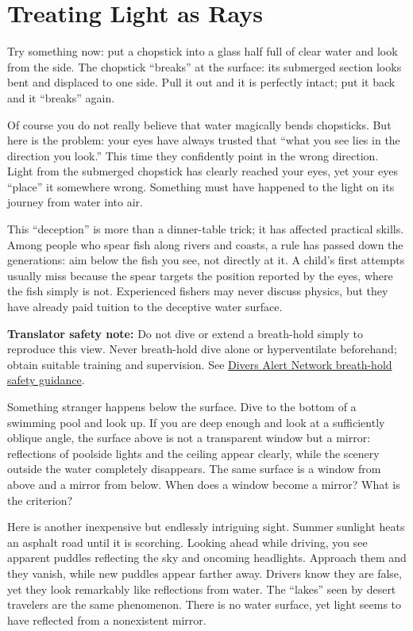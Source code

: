 \chapter{Treating Light as Rays}


Try something now: put a chopstick into a glass half full of clear water and look from the side. The chopstick ``breaks'' at the surface: its submerged section looks bent and displaced to one side. Pull it out and it is perfectly intact; put it back and it ``breaks'' again.

Of course you do not really believe that water magically bends chopsticks. But here is the problem: your eyes have always trusted that ``what you see lies in the direction you look.'' This time they confidently point in the wrong direction. Light from the submerged chopstick has clearly reached your eyes, yet your eyes ``place'' it somewhere wrong. Something must have happened to the light on its journey from water into air.

This ``deception'' is more than a dinner-table trick; it has affected practical skills. Among people who spear fish along rivers and coasts, a rule has passed down the generations: aim below the fish you see, not directly at it. A child's first attempts usually miss because the spear targets the position reported by the eyes, where the fish simply is not. Experienced fishers may never discuss physics, but they have already paid tuition to the deceptive water surface.

\textbf{Translator safety note:} Do not dive or extend a breath-hold simply to reproduce this view. Never breath-hold dive alone or hyperventilate beforehand; obtain suitable training and supervision. See \href{https://world.dan.org/alert-diver/article/freediving-safety-awareness/}{Divers Alert Network breath-hold safety guidance}.

Something stranger happens below the surface. Dive to the bottom of a swimming pool and look up. If you are deep enough and look at a sufficiently oblique angle, the surface above is not a transparent window but a mirror: reflections of poolside lights and the ceiling appear clearly, while the scenery outside the water completely disappears. The same surface is a window from above and a mirror from below. When does a window become a mirror? What is the criterion?

Here is another inexpensive but endlessly intriguing sight. Summer sunlight heats an asphalt road until it is scorching. Looking ahead while driving, you see apparent puddles reflecting the sky and oncoming headlights. Approach them and they vanish, while new puddles appear farther away. Drivers know they are false, yet they look remarkably like reflections from water. The ``lakes'' seen by desert travelers are the same phenomenon. There is no water surface, yet light seems to have reflected from a nonexistent mirror.


